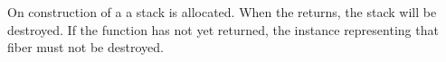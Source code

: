 \label{destruction}

On construction of a \fiber a stack is allocated. When the \entryfn returns,
the stack will be destroyed. If the function has not yet returned,
the \fiber instance representing that fiber must not be destroyed.




